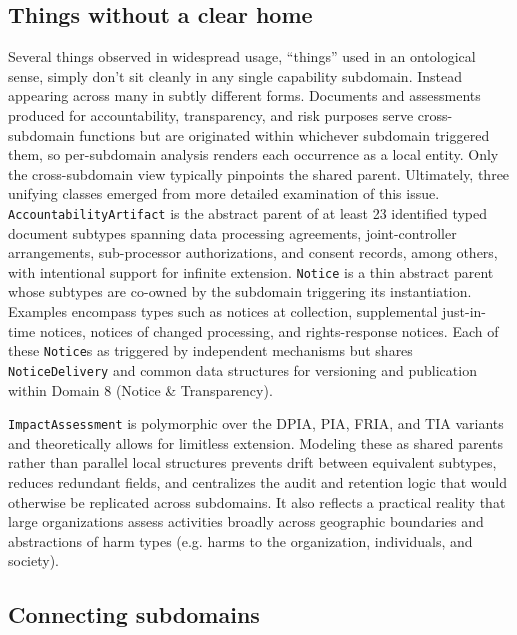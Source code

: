 \documentclass[10pt,letterpaper,twocolumn,twoside]{rho-class/rho}
\begin{document}
\subsection{Things without a clear home}\label{sec:crosscut}

Several things observed in widespread usage, ``things'' used in an ontological sense, simply don't sit cleanly in any single capability subdomain. Instead appearing across many in subtly different forms. Documents and assessments produced for accountability, transparency, and risk purposes serve cross-subdomain functions but are originated within whichever subdomain triggered them, so per-subdomain analysis renders each occurrence as a local entity. Only the cross-subdomain view typically pinpoints the shared parent. Ultimately, three unifying classes emerged from more detailed examination of this issue. \texttt{AccountabilityArtifact} is the abstract parent of at least 23 identified typed document subtypes spanning data processing agreements, joint-controller arrangements, sub-processor authorizations, and consent records, among others, with intentional support for infinite extension. \texttt{Notice} is a thin abstract parent whose subtypes are co-owned by the subdomain triggering its instantiation. Examples encompass types such as notices at collection, supplemental just-in-time notices, notices of changed processing, and rights-response notices. Each of these \texttt{Notice}s as triggered by independent mechanisms but shares \texttt{NoticeDelivery} and common data structures for versioning and publication within Domain 8 (Notice \& Transparency). 

\texttt{ImpactAssessment} is polymorphic over the DPIA, PIA, FRIA, and TIA variants and theoretically allows for limitless extension. Modeling these as shared parents rather than parallel local structures prevents drift between equivalent subtypes, reduces redundant fields, and centralizes the audit and retention logic that would otherwise be replicated across subdomains. It also reflects a practical reality that large organizations assess activities broadly across geographic boundaries and abstractions of harm types (e.g. harms to the organization, individuals, and society). 

\subsection{Connecting subdomains}\label{sec:joins}
\end{document}
